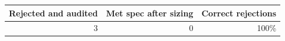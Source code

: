 \begin{tabular}{rrr}
\toprule
Rejected and audited & Met spec after sizing & Correct rejections \\
\midrule
3 & 0 & 100\% \\
\bottomrule
\end{tabular}

